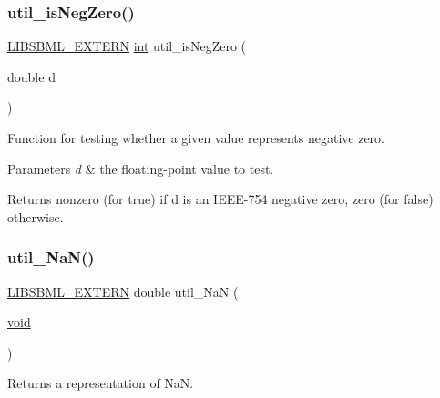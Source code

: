 \subsubsection{\texorpdfstring{util\+\_\+is\+Neg\+Zero()}{util\_isNegZero()}}
{\footnotesize\ttfamily \hyperlink{extern_8h_a8e9e5118f0c55d410f8bc217f2954dbf}{L\+I\+B\+S\+B\+M\+L\+\_\+\+E\+X\+T\+E\+RN} \hyperlink{lp__lib_8h_adeb9ec6400320e4923ac9d836d509ddb}{int} util\+\_\+is\+Neg\+Zero (\begin{DoxyParamCaption}\item[{double}]{d }\end{DoxyParamCaption})}

Function for testing whether a given value represents negative zero.


\begin{DoxyParams}{Parameters}
{\em d} & the floating-\/point value to test.\\
\hline
\end{DoxyParams}
\begin{DoxyReturn}{Returns}
nonzero (for true) if {\ttfamily d} is an I\+E\+E\+E-\/754 negative zero, zero (for false) otherwise. 
\end{DoxyReturn}
\mbox{\label{dependencies_2libsbml-5_815_80-vs2017-release-64_2include_2sbml_2util_2util_8h_a8a73ce205c734f1fbe23d67658c310f7}} 
\subsubsection{\texorpdfstring{util\+\_\+\+Na\+N()}{util\_NaN()}}
{\footnotesize\ttfamily \hyperlink{extern_8h_a8e9e5118f0c55d410f8bc217f2954dbf}{L\+I\+B\+S\+B\+M\+L\+\_\+\+E\+X\+T\+E\+RN} double util\+\_\+\+NaN (\begin{DoxyParamCaption}\item[{\hyperlink{lp__lib_8h_ac7828c7b2b31d2e11af17bdb6289c5d9}{void}}]{ }\end{DoxyParamCaption})}

Returns a representation of {\ttfamily NaN}.


